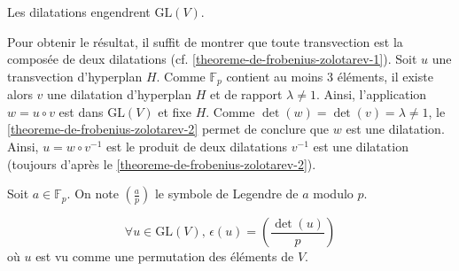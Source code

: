 	
	\begin{lemma}
		\label{theoreme-de-frobenius-zolotarev-3}
		Les dilatations engendrent $\mathrm{GL}(V)$.
	\end{lemma}

	\begin{demonstration}
		Pour obtenir le résultat, il suffit de montrer que toute transvection est la composée de deux dilatations (cf. \cref{theoreme-de-frobenius-zolotarev-1}). Soit $u$ une transvection d'hyperplan $H$. Comme $\mathbb{F}_p$ contient au moins $3$ éléments, il existe alors $v$ une dilatation d'hyperplan $H$ et de rapport $\lambda \neq 1$.
		\newpar
		Ainsi, l'application $w = u \circ v$ est dans $\mathrm{GL}(V)$ et fixe $H$. Comme $\det(w) = \det(v) = \lambda \neq 1$, le \cref{theoreme-de-frobenius-zolotarev-2} permet de conclure que $w$ est une dilatation. Ainsi, $u = w \circ v^{-1}$ est le produit de deux dilatations $v^{-1}$ est une dilatation (toujours d'après le \cref{theoreme-de-frobenius-zolotarev-2}).
	\end{demonstration}

	\begin{notation}
		Soit $a \in \mathbb{F}_p$. On note $\left( \frac{a}{p} \right)$ le symbole de Legendre de $a$ modulo $p$.
	\end{notation}
	
	\begin{theorem}
		\[ \forall u \in \mathrm{GL}(V), \, \epsilon(u) = \left( \frac{\det(u)}{p} \right) \]
		où $u$ est vu comme une permutation des éléments de $V$.
	\end{theorem}

